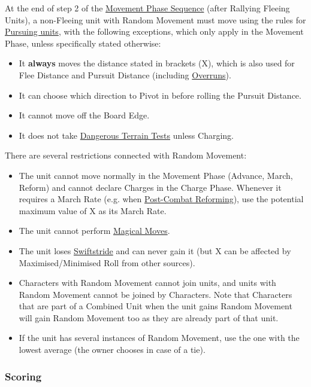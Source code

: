 At the end of step 2 of the \hyperref[the_movement_phase_sequence]{Movement Phase Sequence} (after Rallying Fleeing Units), a non-Fleeing unit with Random Movement must move using the rules for \hyperref[pursuit_distance_and_pursuing_units]{Pursuing units}, with the following exceptions, which only apply in the Movement Phase, unless specifically stated otherwise:

\begin{itemize}
\item It \textbf{always} moves the distance stated in brackets (X), which is also used for Flee Distance and Pursuit Distance (including \hyperref[overrun]{Overruns}).
\item It can choose which direction to Pivot in before rolling the Pursuit Distance.
\item It cannot move off the Board Edge.
\item It does not take \hyperref[dangerous_terrain]{Dangerous Terrain Tests} unless Charging.
\end{itemize}


There are several restrictions connected with Random Movement:

\begin{itemize}
\item The unit cannot move normally in the Movement Phase (Advance, March, Reform) and cannot declare Charges in the Charge Phase. Whenever it requires a March Rate (e.g. when \hyperref[post_combat_reform]{Post-Combat Reforming}), use the potential maximum value of X as its March Rate.
\item The unit cannot perform \hyperref[magical_move]{Magical Moves}.
\item The unit loses \hyperref[swiftstride]{Swiftstride} and can never gain it (but X can be affected by Maximised/Minimised Roll from other sources).
\item Characters with Random Movement cannot join units, and units with Random Movement cannot be joined by Characters. Note that Characters that are part of a Combined Unit when the unit gains Random Movement will gain Random Movement too as they are already part of that unit.
\item If the unit has several instances of Random Movement, use the one with the lowest average (the owner chooses in case of a tie).
\end{itemize}

\subsubsection{Scoring}
\idx[main=y]{\scoring}\label{scoring}

